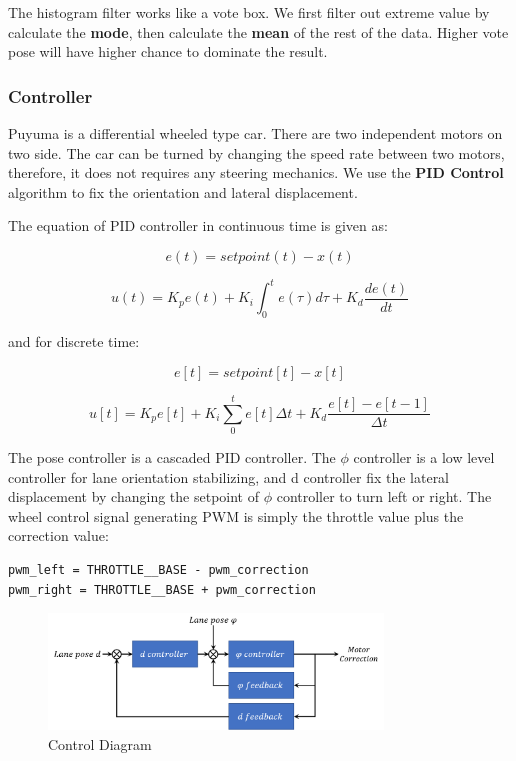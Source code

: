 \documentclass[conference]{IEEEtran}
\begin{document}
The histogram filter works like a vote box. We first filter out extreme value by calculate the \textbf{mode}, then calculate the \textbf{mean} of the rest of the data. Higher vote pose will have higher chance to dominate the result.

\subsubsection{Controller}

Puyuma is a differential wheeled type car. There are two independent motors on two side. The car can be turned by changing the speed rate between two motors, therefore, it does not requires any steering mechanics. We use the \textbf{PID Control} algorithm to fix the orientation and lateral displacement.

The equation of PID controller in continuous time is given as:

\[e(t) = setpoint(t) - x(t)\]

\[u(t) = K_p e(t) + K_i \int_{0}^{t} e(\tau) d\tau + K_d  \frac{de(t)}{dt}\]

and for discrete time:

\[e[t] = setpoint[t] - x[t]\]

\[u[t] = K_p e[t] + K_i \sum_0^t e[t] \Delta t + K_d \frac{e[t] - e[t-1]}{\Delta t}\]

The pose controller is a cascaded PID controller. The $\phi$ controller is a low level controller for lane orientation stabilizing, and d controller fix the lateral displacement by changing the setpoint of $\phi$ controller to turn left or right.
The wheel control signal generating PWM is simply the throttle value plus the correction value:

\begin{lstlisting}
pwm_left = THROTTLE__BASE - pwm_correction
pwm_right = THROTTLE__BASE + pwm_correction
\end{lstlisting}

\begin{figure}	
	\centering
	\includegraphics[width=3.5in]{img/controller.png}
	\caption{Control Diagram}
	\label{fig:controller}
\end{figure}
\end{document}
